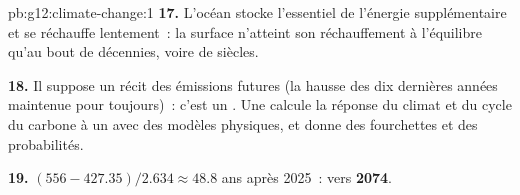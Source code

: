 \begin{solution}{pb:g12:climate-change:1}
\textbf{17.} L'océan stocke l'essentiel de l'énergie supplémentaire et se
réchauffe lentement~: la surface n'atteint son réchauffement à l'équilibre
qu'au bout de décennies, voire de siècles.

\textbf{18.} Il suppose un récit des émissions futures (la hausse des dix
dernières années maintenue pour toujours)~: c'est un . Une
 calcule la réponse du climat et du cycle du carbone à un
 avec des modèles physiques, et donne des fourchettes
et des probabilités.

\textbf{19.} $(556 - 427.35)/2.634 \approx 48.8$ ans après 2025~: vers
\textbf{2074}.
\end{solution}
